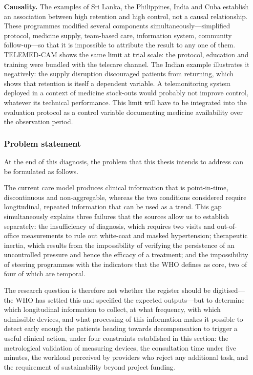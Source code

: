 \documentclass[12pt,a4paper,oneside]{report}
\begin{document}
\textbf{Causality.} The examples of Sri Lanka, the Philippines, India and Cuba establish an association between high retention and high control, not a causal relationship. These programmes modified several components simultaneously---simplified protocol, medicine supply, team-based care, information system, community follow-up---so that it is impossible to attribute the result to any one of them. TELEMED-CAM shows the same limit at trial scale: the protocol, education and training were bundled with the telecare channel. The Indian example illustrates it negatively: the supply disruption discouraged patients from returning, which shows that retention is itself a dependent variable. A telemonitoring system deployed in a context of medicine stock-outs would probably not improve control, whatever its technical performance. This limit will have to be integrated into the evaluation protocol as a control variable documenting medicine availability over the observation period.

\subsubsection{Problem statement}

At the end of this diagnosis, the problem that this thesis intends to address can be formulated as follows.

The current care model produces clinical information that is point-in-time, discontinuous and non-aggregable, whereas the two conditions considered require longitudinal, repeated information that can be used as a trend. This gap simultaneously explains three failures that the sources allow us to establish separately: the insufficiency of diagnosis, which requires two visits and out-of-office measurements to rule out white-coat and masked hypertension; therapeutic inertia, which results from the impossibility of verifying the persistence of an uncontrolled pressure and hence the efficacy of a treatment; and the impossibility of steering programmes with the indicators that the WHO defines as core, two of four of which are temporal.

The research question is therefore not whether the register should be digitised---the WHO has settled this and specified the expected outputs---but to determine which longitudinal information to collect, at what frequency, with which admissible devices, and what processing of this information makes it possible to detect early enough the patients heading towards decompensation to trigger a useful clinical action, under four constraints established in this section: the metrological validation of measuring devices, the consultation time under five minutes, the workload perceived by providers who reject any additional task, and the requirement of sustainability beyond project funding.
\end{document}
